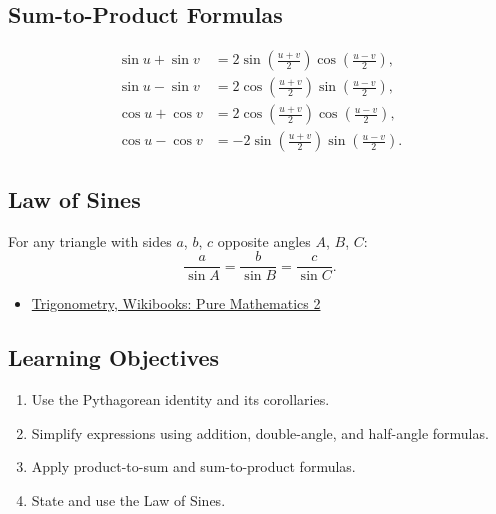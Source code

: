 \subsection*{Sum-to-Product Formulas}

\begin{align}
  \sin u + \sin v &= 2\sin\!\left(\frac{u+v}{2}\right)\cos\!\left(\frac{u-v}{2}\right), \\
  \sin u - \sin v &= 2\cos\!\left(\frac{u+v}{2}\right)\sin\!\left(\frac{u-v}{2}\right), \\
  \cos u + \cos v &= 2\cos\!\left(\frac{u+v}{2}\right)\cos\!\left(\frac{u-v}{2}\right), \\
  \cos u - \cos v &= -2\sin\!\left(\frac{u+v}{2}\right)\sin\!\left(\frac{u-v}{2}\right).
\end{align}

\subsection*{Law of Sines}

For any triangle with sides $a$, $b$, $c$ opposite angles $A$, $B$, $C$:
\[
  \frac{a}{\sin A} = \frac{b}{\sin B} = \frac{c}{\sin C}.
\]

\begin{itemize}
  \item \href{https://en.wikibooks.org/wiki/A-level_Mathematics/CIE/Pure_Mathematics_2/Trigonometry}{Trigonometry, Wikibooks: Pure Mathematics 2}
\end{itemize}

\subsection{Learning Objectives}
\label{ssec:lear-fe6e}

\begin{enumerate}
    \item Use the Pythagorean identity and its corollaries.
    \item Simplify expressions using addition, double-angle, and half-angle formulas.
    \item Apply product-to-sum and sum-to-product formulas.
    \item State and use the Law of Sines.
\end{enumerate}


